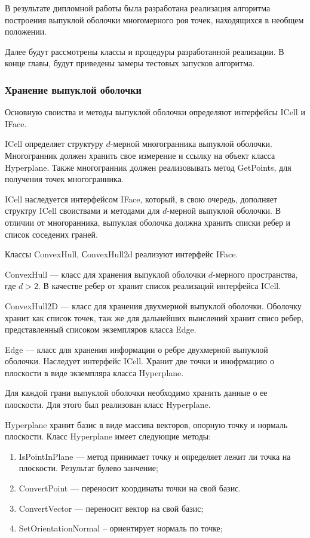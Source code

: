 \documentclass[14pt]{extarticle}
\begin{document}
В результате дипломной работы была разработана реализация алгоритма построения выпуклой оболочки многомерного роя точек, находящихся в необщем положении.

Далее будут рассмотрены классы и процедуры разработанной реализации.
В конце главы, будут приведены замеры тестовых запусков алгоритма.
\subsubsection{Хранение выпуклой оболочки}

Основную своиства и методы выпуклой оболочки определяют интерфейсы ICell и IFace.

ICell определяет структуру $d$-мерной многогранника выпуклой оболочки. Многогранник должен хранить свое измерение и ссылку на объект класса Hyper\-plane. Также многогранник должен реализовывать метод GetPoints, для получения точек многогранника.

ICell наследуется интерфейсом IFace, который, в свою очередь, дополняет структру ICell своиствами и методами для $d$-мерной выпуклой оболочки.
В отличии от многоранника, выпуклая оболочка должна хранить списки ребер и список соседених граней.

Классы ConvexHull, СonvexHull2d реализуют интерфейс IFace.

ConvexHull --- класс для хранения выпуклой оболочки $d$-мерного пространства, где $d>2$. В качестве ребер от хранит список реализаций интерфейса ICell.

ConvexHull2D --- класс для хранения двухмерной выпуклой оболочки. Оболочку хранит как список точек, таж же для дальнейших выислений хранит списо ребер, представленный списоком экземпляров класса Edge.

Edge --- класс для хранения информации о ребре двухмерной выпуклой оболочки. Наследует интерфейс ICell. Хранит две точки и инофрмацию о плоскости в виде экземпляра класса Hyperplane.

Для каждой грани выпуклой оболочки необходимо хранить данные о ее плоскости. Для этого был реализован класс Hyperplane.

Hyperplane хранит базис в виде массива векторов, опорную точку и нормаль плоскости. Класс Hyperplane имеет следующие методы:
\begin{enumerate}[topsep=-0.5\parsep,itemsep=-0.5\parsep]
  \item IsPointInPlane --- метод принимает точку и определяет лежит ли точка на плоскости. Результат булево занчение;
  \item ConvertPoint --- переносит координаты точки на свой базис.
  \item ConvertVector --- переносит вектор на свой базис;
  \item SetOrientationNormal -- ориентирует нормаль по точке;
\end{enumerate}
\medskip
\end{document}
